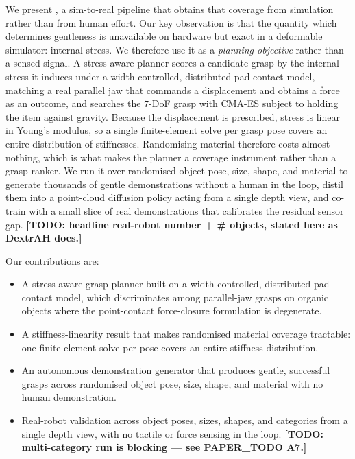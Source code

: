 We present \method, a sim-to-real pipeline that obtains that coverage from simulation rather
than from human effort. Our key observation is that the quantity which determines gentleness
is unavailable on hardware but exact in a deformable simulator: internal stress. We therefore
use it as a \emph{planning objective} rather than a sensed signal. A stress-aware planner
scores a candidate grasp by the internal stress it induces under a width-controlled,
distributed-pad contact model, matching a real parallel jaw that commands a displacement and
obtains a force as an outcome, and searches the $7$-DoF grasp with CMA-ES subject to holding
the item against gravity. Because the displacement is prescribed, stress is linear in Young's
modulus, so a single finite-element solve per grasp pose covers an entire distribution of
stiffnesses. Randomising material therefore costs almost nothing, which is what makes the
planner a coverage instrument rather than a grasp ranker. We run it over randomised object
pose, size, shape, and material to generate thousands of gentle demonstrations without a human
in the loop, distil them into a point-cloud diffusion policy acting from a single depth view,
and co-train with a small slice of real demonstrations that calibrates the residual sensor
gap. \textbf{[TODO: headline real-robot number + \# objects, stated here as DextrAH does.]}

\noindent Our contributions are:
\begin{itemize}
  \item A stress-aware grasp planner built on a width-controlled, distributed-pad contact
        model, which discriminates among parallel-jaw grasps on organic objects where the
        point-contact force-closure formulation is degenerate.
  \item A stiffness-linearity result that makes randomised material coverage tractable: one
        finite-element solve per pose covers an entire stiffness distribution.
  \item An autonomous demonstration generator that produces gentle, successful grasps across
        randomised object pose, size, shape, and material with no human demonstration.
  \item Real-robot validation across object poses, sizes, shapes, and categories from a single
        depth view, with no tactile or force sensing in the loop.
        \textbf{[TODO: multi-category run is blocking --- see PAPER\_TODO A7.]}
\end{itemize}
